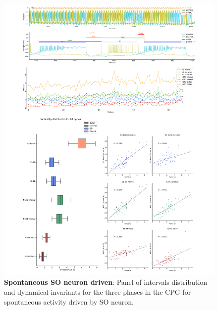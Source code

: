\begin{figure}[htbp]
	\centering
	\includegraphics[width=1.1\textwidth]{./invariants/data/SUSSEX/prep4_so_driven_2/images/panel_with_intervals.pdf}
	\caption{\textbf{Spontaneous SO neuron driven}: Panel of intervals distribution and dynamical invariants for the three phases in the CPG for spontaneous activity driven by SO neuron.}
	\label{fig:so spontaneous invariants}
\end{figure}

